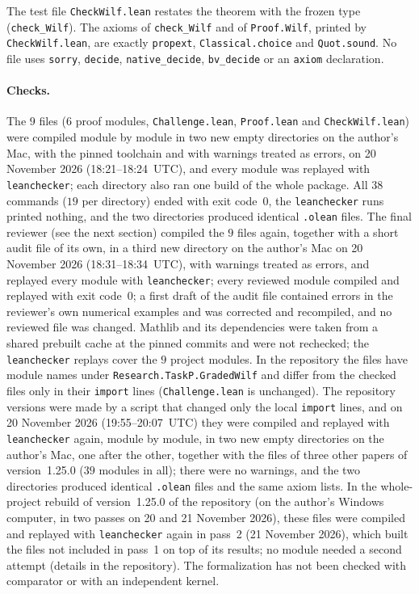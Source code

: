 \documentclass[11pt]{article}
\theoremstyle{definition}
\theoremstyle{remark}
\newcommand{\repoversion}{1.25.0}
\begin{document}
{\noindent The test file \texttt{CheckWilf.lean} restates the theorem with the
frozen type (\texttt{check\_\allowbreak Wilf}). The axioms of
\texttt{check\_\allowbreak Wilf} and of \texttt{Proof.Wilf}, printed by
\texttt{CheckWilf.lean}, are exactly \texttt{propext}, \texttt{Classical.choice}
and \texttt{Quot.sound}. No file uses \texttt{sorry}, \texttt{decide},
\texttt{native\_\allowbreak decide}, \texttt{bv\_\allowbreak decide} or an
\texttt{axiom} declaration.

\paragraph{Checks.}
The $9$ files ($6$ proof modules, \texttt{Challenge.lean}, \texttt{Proof.lean}
and \texttt{CheckWilf.lean}) were compiled module by module in two new empty
directories on the author's Mac, with the pinned toolchain and with warnings
treated as errors, on 20 November 2026 (18:21--18:24~UTC), and every module was
replayed with \texttt{leanchecker}; each directory also ran one build of the
whole package. All $38$ commands ($19$ per directory) ended with exit code~$0$,
the \texttt{leanchecker} runs printed nothing, and the two directories produced
identical \texttt{.olean} files. The final reviewer (see the next section)
compiled the $9$ files again, together with a short audit file of its own, in a
third new directory on the author's Mac on 20 November 2026 (18:31--18:34~UTC),
with warnings treated as errors, and replayed every module with
\texttt{leanchecker}; every reviewed module compiled and replayed with exit
code~$0$; a first draft of the audit file contained errors in the reviewer's own
numerical examples and was corrected and recompiled, and no reviewed file was
changed. Mathlib and its dependencies were
taken from a shared prebuilt cache at the pinned commits and were not rechecked;
the \texttt{leanchecker} replays cover the $9$ project modules. In the repository
the files have module names under \texttt{Research.TaskP.GradedWilf} and differ
from the checked files only in their \texttt{import} lines
(\texttt{Challenge.lean} is unchanged). The repository versions were made by a script that changed only the local \texttt{import} lines, and on 20 November 2026 (19:55--20:07~UTC) they were compiled and replayed with \texttt{leanchecker} again, module by module, in two new empty directories on the author's Mac, one after the other, together with the files of three other papers of version~\repoversion{} ($39$ modules in all); there were no warnings, and the two directories produced identical \texttt{.olean} files and the same axiom lists. In the whole-project rebuild of version~\repoversion{} of the repository (on the author's Windows computer, in two passes on 20 and 21 November 2026), these files were compiled and replayed with \texttt{leanchecker} again in pass~2 (21 November 2026), which built the files not included in pass~1 on top of its results; no module needed a second attempt (details in the repository). The
formalization has not been checked with comparator or with an independent
kernel.

\par}
\end{document}
